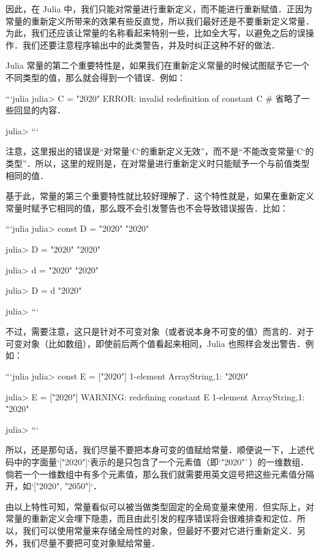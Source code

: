 因此，在 Julia 中，我们只能对常量进行重新定义，而不能进行重新赋值．正因为常量的重新定义所带来的效果有些反直觉，所以我们最好还是不要重新定义常量．为此，我们还应该让常量的名称看起来特别一些，比如全大写，以避免之后的误操作．我们还要注意程序输出中的此类警告，并及时纠正这种不好的做法．

Julia 常量的第二个重要特性是，如果我们在重新定义常量的时候试图赋予它一个不同类型的值，那么就会得到一个错误．例如：

```julia
julia> C = "2020"
ERROR: invalid redefinition of constant C
# 省略了一些回显的内容．

julia> 
```

注意，这里报出的错误是“对常量`C`的重新定义无效”，而不是“不能改变常量`C`的类型”．所以，这里的规则是，在对常量进行重新定义时只能赋予一个与前值类型相同的值．

基于此，常量的第三个重要特性就比较好理解了．这个特性就是，如果在重新定义常量时赋予它相同的值，那么既不会引发警告也不会导致错误报告．比如：

```julia
julia> const D = "2020"
"2020"

julia> D = "2020"
"2020"

julia> d = "2020"
"2020"

julia> D = d
"2020"

julia> 
```

不过，需要注意，这只是针对不可变对象（或者说本身不可变的值）而言的．对于可变对象（比如数组），即使前后两个值看起来相同，Julia 也照样会发出警告．例如：

```julia
julia> const E = ["2020"]
1-element Array{String,1}:
 "2020"

julia> E = ["2020"]
WARNING: redefining constant E
1-element Array{String,1}:
 "2020"

julia> 
```

所以，还是那句话，我们尽量不要把本身可变的值赋给常量．顺便说一下，上述代码中的字面量`["2020"]`表示的是只包含了一个元素值（即`"2020"`）的一维数组．倘若一个一维数组中有多个元素值，那么我们就需要用英文逗号把这些元素值分隔开，如`["2020", "2050"]`．

由以上特性可知，常量看似可以被当做类型固定的全局变量来使用．但实际上，对常量的重新定义会埋下隐患，而且由此引发的程序错误将会很难排查和定位．所以，我们可以使用常量来存储全局性的对象，但最好不要对它进行重新定义．另外，我们尽量不要把可变对象赋给常量．


